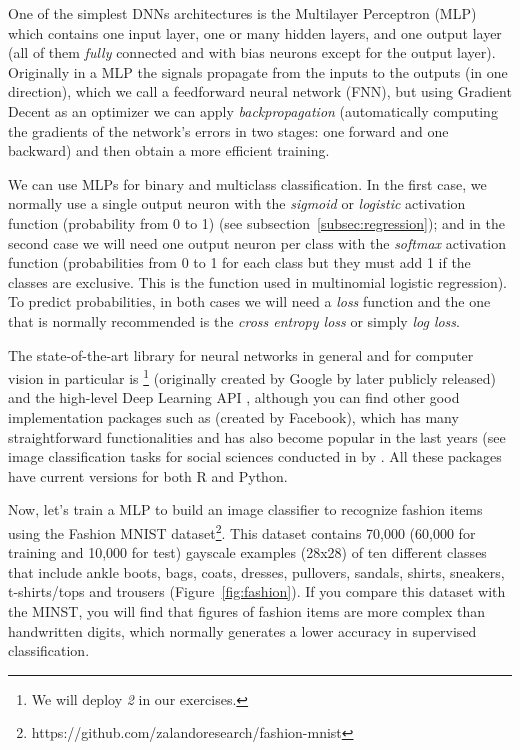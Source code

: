 One of the simplest DNNs architectures is the Multilayer Perceptron (MLP) which contains one input layer, one or many hidden layers, and one output layer (all of them \textit{fully} connected and with bias neurons except for the output layer). Originally in a MLP the signals propagate from the inputs to the outputs (in one direction), which we call a feedforward neural network (FNN), but using Gradient Decent as an optimizer we can apply \textit{backpropagation} (automatically computing the gradients of the network's errors in two stages: one forward and one backward) and then obtain a more efficient training.

We can use MLPs for binary and multiclass classification. In the first case, we normally use a single output neuron with the \textit{sigmoid} or \textit{logistic} activation function (probability from 0 to 1) (see subsection~\ref{subsec:regression}); and in the second case we will need one output neuron per class with the \textit{softmax} activation function (probabilities from 0 to 1 for each class but they must add 1 if the classes are exclusive. This is the function used in multinomial logistic regression). To predict probabilities, in both cases we will need a \textit{loss} function and the one that is normally recommended is the \textit{cross entropy loss} or simply \textit{log loss}.

The state-of-the-art library for neural networks in general and for computer vision in particular is \footnote{We will deploy  \textit{2} in our exercises.}  (originally created by Google by later publicly released) and the high-level Deep Learning API , although you can find other good implementation packages such as  (created by Facebook), which has many straightforward functionalities and has also become popular in the last years (see image classification tasks for social sciences conducted in  by \citet{williams2020images}. All these packages have current versions for both R and Python. 

Now, let's train a MLP to build an image classifier to recognize fashion items using the Fashion MNIST dataset\footnote{https://github.com/zalandoresearch/fashion-mnist}. This dataset contains 70,000 (60,000 for training and 10,000 for test) gayscale examples (28x28) of ten different classes that include ankle boots, bags, coats, dresses, pullovers, sandals, shirts, sneakers, t-shirts/tops and trousers (Figure~\ref{fig:fashion}). If you compare this dataset with the MINST, you will find that figures of fashion items are more complex than handwritten digits, which normally generates a lower accuracy in supervised classification.

